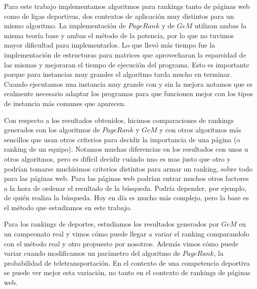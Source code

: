 

Para este trabajo implementamos algoritmos para rankings tanto de páginas web como de ligas deportivas, dos contextos de aplicación muy distintos para un mismo algoritmo. La implementación de $PageRank$ y de $GeM$ utilizan ambas la misma teoría base y ambas el método de la potencia, por lo que no tuvimos mayor dificultad para implementarlos. Lo que llevó más tiempo fue la implementación de estructuras para matrices que aprovecharan la esparsidad de las mismas y mejoraran el tiempo de ejecución del programa. Esto es importante porque para instancias muy grandes el algoritmo tarda mucho en terminar. Cuando ejecutamos una instancia muy grande con y sin la mejora notamos que es realmente necesario adaptar los programas para que funcionen mejor con los tipos de instancia más comunes que aparecen.

Con respecto a los resultados obtenidos, hicimos comparaciones de rankings generados con los algoritmos de $PageRank$ y $GeM$ y con otros algoritmos más sencillos que usan otros criterios para decidir la importancia de una página (o ranking de un equipo). Notamos muchas diferencias en los resultados con unos u otros algoritmos, pero es difícil decidir cuándo uno es mas justo que otro y podrían tomarse muchisimos criterios distintos para armar un ranking, sobre todo para las páginas web. Para las páginas web podrían entrar muchos otros factores a la hora de ordenar el resultado de la búsqueda. Podría depender, por ejemplo, de quién realiza la búsqueda. Hoy en día es mucho más complejo, pero la base es el método que estudiamos en este trabajo. 

Para los rankings de deportes, estudiamos los resultados generados por $GeM$ en un campeonato real y vimos cómo puede llegar a variar el ranking comparandolo con el método real y otro propuesto por nosotros. Además vimos cómo puede variar cuando modificamos un parámetro del algoritmo de $PageRank$, la probabilidad de teletransportación. En el contexto de una competencia deportiva se puede ver mejor esta variación, no tanto en el contexto de rankings de páginas web.

















